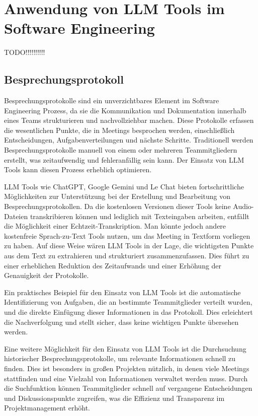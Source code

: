 
\chapter{Anwendung von LLM Tools im Software Engineering} 

TODO!!!!!!!!!!

\section{Besprechungsprotokoll}  \label{Besprechungsprotokoll}

Besprechungsprotokolle sind ein unverzichtbares Element im Software Engineering Prozess, da sie die Kommunikation 
und Dokumentation innerhalb eines Teams strukturieren und nachvollziehbar machen. Diese Protokolle erfassen die 
wesentlichen Punkte, die in Meetings besprochen werden, einschließlich Entscheidungen, Aufgabenverteilungen und 
nächste Schritte. Traditionell werden Besprechungsprotokolle manuell von einem oder mehreren Teammitgliedern erstellt, 
was zeitaufwendig und fehleranfällig sein kann. Der Einsatz von LLM Tools kann diesen Prozess erheblich optimieren. 

LLM Tools wie ChatGPT, Google Gemini und Le Chat bieten fortschrittliche Möglichkeiten zur Unterstützung bei der Erstellung 
und Bearbeitung von Besprechungsprotokollen. Da die kostenlosen Versionen dieser Tools keine Audio-Dateien transkribieren 
können und lediglich mit Texteingaben arbeiten, entfällt die Möglichkeit einer Echtzeit-Transkription. Man könnte jedoch 
andere kostenfreie Sprach-zu-Text Tools nutzen, um das Meeting in Textform vorliegen zu haben. Auf diese Weise wären LLM 
Tools in der Lage, die wichtigsten Punkte aus dem Text zu extrahieren und strukturiert zusammenzufassen. Dies führt zu einer 
erheblichen Reduktion des Zeitaufwands und einer Erhöhung der Genauigkeit der Protokolle.

Ein praktisches Beispiel für den Einsatz von LLM Tools ist die automatische Identifizierung von Aufgaben, die an bestimmte 
Teammitglieder verteilt wurden, und die direkte Einfügung dieser Informationen in das Protokoll. Dies erleichtert die 
Nachverfolgung und stellt sicher, dass keine wichtigen Punkte übersehen werden.

Eine weitere Möglichkeit für den Einsatz von LLM Tools ist die Durchsuchung historischer Besprechungsprotokolle, um relevante 
Informationen schnell zu finden. Dies ist besonders in großen Projekten nützlich, in denen viele Meetings stattfinden und eine
Vielzahl von Informationen verwaltet werden muss. Durch die Suchfunktion können Teammitglieder schnell auf vergangene 
Entscheidungen und Diskussionspunkte zugreifen, was die Effizienz und Transparenz im Projektmanagement erhöht.

